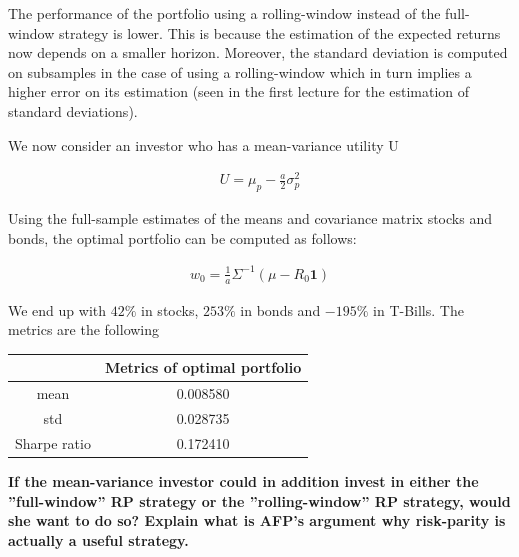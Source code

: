 \documentclass[10pt]{article}
\newenvironment{exercise}[2][Exercise]{\begin{trivlist}
  \item[\hskip \labelsep {\bfseries #1}\hskip \labelsep {\bfseries #2.}]}{\end{trivlist}}
\begin{document}
\begin{exercise}{3}
	\smallbreak
	
	The performance of the portfolio using a rolling-window instead of the full-window strategy is lower. This is because the estimation of  the expected returns now depends on a smaller horizon. Moreover, the standard deviation is computed on subsamples in the case of using a rolling-window which in turn implies a higher error on its estimation (seen in the first lecture for the estimation of standard deviations).
	
	\bigbreak
	
	We now consider an investor who has a mean-variance utility U
	
	\begin{align*}
		U = \mu_{p} - \frac{a}{2}\sigma^{2}_{p}
	\end{align*}
	
	Using the full-sample estimates of the means and covariance matrix stocks and bonds, the optimal portfolio can be computed as follows:
	
	\begin{align*}
		w_{0} = \frac{1}{a} \Sigma^{-1} (\mu  - R_{0}\textbf{1})
	\end{align*}
	
	We end up with $42\%$ in stocks, $253\%$ in bonds and $-195\%$ in T-Bills. The metrics are the following
	
	\begin{table}[h!]
		\centering
 		\begin{tabular}{||c c||} 
 			\hline
 			& Metrics of optimal portfolio \\ [0.5ex] 
 			\hline\hline
 			mean & 0.008580 \\ 
 			std & 0.028735 \\
 			Sharpe ratio & 0.172410 \\ [1ex] 
 			\hline
		 \end{tabular}
	\end{table}	
	
	\textbf{If the mean-variance investor could in addition invest in either the ”full-window” RP strategy or the ”rolling-window” RP strategy, would she want to do so? Explain what is AFP’s argument why risk-parity is actually a useful strategy.}
	
	\smallbreak
	
	

\end{exercise}
  
\end{document}

